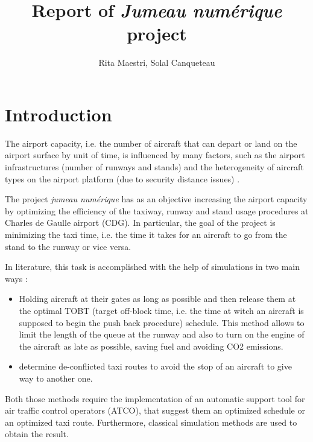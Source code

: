 \documentclass{article}
\begin{document}
	
	\title{Report of \textit{Jumeau numérique} project}
	\author{Rita Maestri, Solal Canqueteau}
	\maketitle
	
\newpage

\tableofcontents
\newpage

	
\part{Introduction}

The airport capacity, i.e. the number of aircraft that can depart or land on the airport surface by unit of time, is influenced by many factors, such as the airport infrastructures (number of runways and stands) and the heterogeneity of aircraft types on the airport platform (due to security distance issues) \cite{gotteland}.

The project \textit{jumeau numérique} has as an objective increasing the airport capacity by optimizing the efficiency of the taxiway, runway and stand usage procedures at Charles de Gaulle airport (CDG). In particular, the goal of the project is minimizing the taxi time, i.e. the time it takes for an aircraft to go from the stand to the runway or vice versa.

In literature, this task is accomplished with the help of simulations in two main ways \cite{rathinam}:

\begin{itemize}
	\item Holding aircraft at their gates as
	long as possible and then release them at the optimal TOBT (target off-block time, i.e. the time at witch an aircraft is supposed to begin the push back procedure)
	schedule. This method allows to limit the length of the queue at the runway and also to turn on the engine of the aircraft as late as possible, saving fuel and avoiding CO2 emissions.

	\item determine de-conflicted taxi routes to avoid the stop of an aircraft to give way to another one.
\end{itemize}

Both those methods require the implementation of an automatic support tool for air traffic control operators (ATCO), that suggest them an optimized schedule or an optimized taxi route. Furthermore, classical simulation methods are used to obtain the result.
\end{document}
